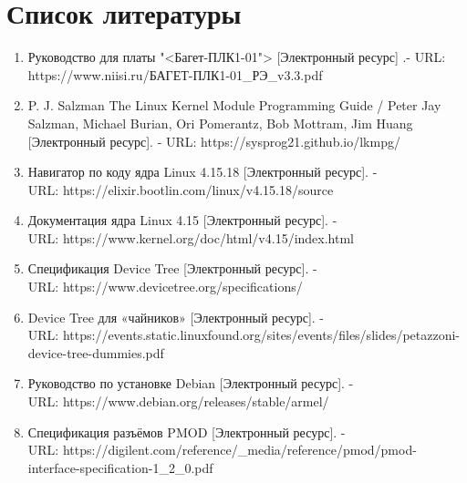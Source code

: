 \chapter*{Список литературы}

\begin{enumerate}
	\item Руководство для платы "<Багет-ПЛК1-01"> [Электронный ресурс] .- URL: https://www.niisi.ru/БАГЕТ-ПЛК1-01\_РЭ\_v3.3.pdf
	
	\item P. J. Salzman The Linux Kernel Module Programming Guide / Peter Jay Salzman, Michael Burian, Ori Pomerantz, Bob Mottram, Jim Huang [Электронный ресурс]. - URL: https://sysprog21.github.io/lkmpg/
	
	\item Навигатор по коду ядра Linux 4.15.18 [Электронный ресурс]. - \\
	URL: https://elixir.bootlin.com/linux/v4.15.18/source
	
	\item Документация ядра Linux 4.15 [Электронный ресурс]. - \\ 
	URL: https://www.kernel.org/doc/html/v4.15/index.html
	
	\item  Спецификация Device Tree [Электронный ресурс]. - \\
	URL: https://www.devicetree.org/specifications/
	
	\item Device Tree для «чайников» [Электронный ресурс]. - \\
	URL: https://events.static.linuxfound.org/sites/events/files/slides/petazzoni-device-tree-dummies.pdf
	
	\item  Руководство по установке Debian [Электронный ресурс]. - \\
	URL: https://www.debian.org/releases/stable/armel/
	
	\item  Спецификация разъёмов PMOD [Электронный ресурс]. - \\
	URL: https://digilent.com/reference/\_media/reference/pmod/pmod-interface-specification-1\_2\_0.pdf
\end{enumerate}